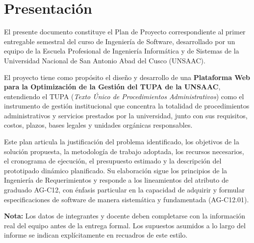 \section{Presentación}

El presente documento constituye el Plan de Proyecto correspondiente al primer
entregable semestral del curso de Ingeniería de Software, desarrollado por un equipo
de la Escuela Profesional de Ingeniería Informática y de Sistemas de la Universidad
Nacional de San Antonio Abad del Cusco (UNSAAC).

El proyecto tiene como propósito el diseño y desarrollo de una \textbf{Plataforma Web
para la Optimización de la Gestión del TUPA de la UNSAAC}, entendiendo el TUPA
(\emph{Texto Único de Procedimientos Administrativos}) como el instrumento de gestión
institucional que concentra la totalidad de procedimientos administrativos y servicios
prestados por la universidad, junto con sus requisitos, costos, plazos, bases legales
y unidades orgánicas responsables.

Este plan articula la justificación del problema identificado, los objetivos de la
solución propuesta, la metodología de trabajo adoptada, los recursos necesarios, el
cronograma de ejecución, el presupuesto estimado y la descripción del prototipado
dinámico planificado. Su elaboración sigue los principios de la Ingeniería de
Requerimientos y responde a los lineamientos del atributo de graduado AG-C12, con
énfasis particular en la capacidad de adquirir y formular especificaciones de software
de manera sistemática y fundamentada (AG-C12.01).

\begin{supuesto}
\small\textbf{Nota:} Los datos de integrantes y docente deben completarse con la
información real del equipo antes de la entrega formal. Los supuestos asumidos a lo
largo del informe se indican explícitamente en recuadros de este estilo.
\end{supuesto}
